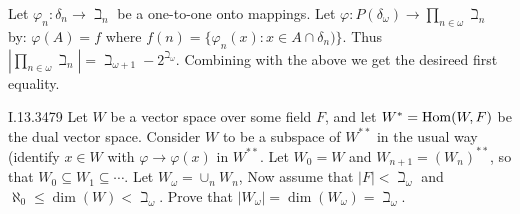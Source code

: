 Let \(\varphi_n: \delta_n \to \beth_n\) be a one-to-one onto mappings.
Let \(\varphi: P(\delta_\omega) \to \prod_{n\in\omega}\beth_n\) by:
\(\varphi(A) = f\) where \(f(n) = \{\varphi_n(x): x\in A\cap \delta_n)\}\).
Thus \(|\prod_{n\in\omega}\beth_n| = \beth_{\omega + 1} - 2^{\beth_\omega}\).
Combining with the above we get the desireed first equality.

\begin{lexcopy}{I.13.34}{79}
Let $W$ be a vector space over some field $F$, and let \(W^* = \operatorname{Hom}(W, F)\)
be the dual vector space. Consider $W$ to be a subspace of \(W^{**}\) in
the usual way (identify \(x \in W\) with
\(\varphi \to \varphi(x)\) in \(W^{**}\). Let \(W_0 = W\) and
\(W_{n+1} = (W_n)^{**}\), so that
\(W_0 \subseteq W_1 \subseteq \cdots\). Let \(W_\omega = \cup_n W_n\),
Now assume that
\(|F| < \beth_\omega\) and \(\aleph_0 \leq \dim(W) < \beth_\omega\).
Prove that \(|W_\omega| = \dim(W_\omega) = \beth_\omega\).
\end{lexcopy}
\unfinished
